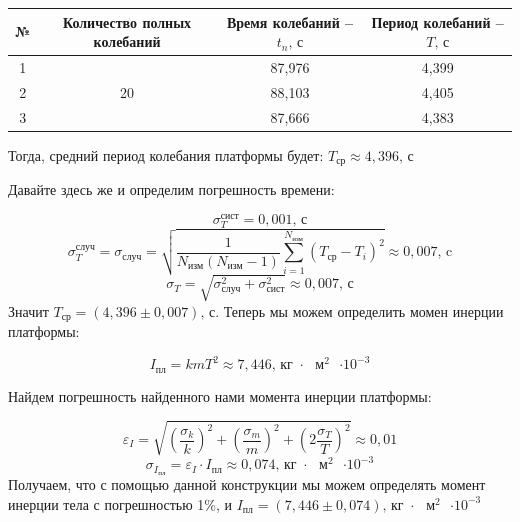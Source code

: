 \documentclass[a4paper,12pt]{article}
\begin{document}
	\begin{table}[!h]
		\begin{center}
			\begin{tabular}{|c|c|c|c|}
				\hline
				№ & Количество полных колебаний & Время колебаний -- $t_n \text{, с}$ & Период колебаний -- $T\text{, с}$\\
				\hline
				1 & \multirow{3}{*}{20} & 87,976 & 4,399\\
				\cline{1-1} \cline{3-4}
				2 &  & 88,103 & 4,405\\
				\cline{1-1} \cline{3-4}
				3 & & 87,666 & 4,383\\
				\hline
			\end{tabular}
		\end{center}
	\end{table}
	
	Тогда, средний период колебания платформы будет: $T_\text{ср} \approx 4,396\text{, с}$
	
	Давайте здесь же и определим погрешность времени: 
	
	\begin{equation}
		\sigma_T^{\text{сист}} = 0,001\text{, с}
	\end{equation}
	\begin{equation}
		\sigma_T^{\text{случ}} = \sigma_\text{случ}=\sqrt{\frac{1}{  N_\text{изм} \left( N_\text{изм} - 1 \right)}\sum_{i=1}^{N_\text{изм}}\left( T_\text{ср} - T_i \right)^2 } \approx 0,007\text{, c}
	\end{equation}
	\begin{equation}
		\sigma_T = \sqrt{\sigma_\text{случ}^{2} + \sigma_{\text{сист}}^{2}} \approx 0,007\text{, с}
	\end{equation}
	Значит $T_\text{ср} = \left(4,396 \pm 0,007\right)\text{, с}$. Теперь мы можем определить момен инерции платформы:
	
	\begin{equation}
			I_\text{пл} = kmT^2 \approx 7,446  \text{,  кг $\cdot$ $\text{м}^2$ $\cdot 10^{-3}$}  
	\end{equation}

	Найдем погрешность найденного нами момента инерции платформы:
	
	\begin{equation}
		\varepsilon_I = \sqrt{ \left(\frac{\sigma_k}{k}\right)^2 +\left(\frac{\sigma_m}{m}\right)^2 + \left(2\frac{\sigma_T}{T}\right)^2} \approx 0,01
	\end{equation}
	\begin{equation}
		\sigma_{I_\text{пл}} = \varepsilon_I \cdot I_\text{пл} \approx 0,074 \text{,  кг $\cdot$ $\text{м}^2$ $\cdot 10^{-3}$}
	\end{equation}
	Получаем, что с помощью данной конструкции мы можем определять момент инерции тела с погрешностью 1\%, и $I_\text{пл} = \left(7,446 \pm 0,074\right) \text{,  кг $\cdot$ $\text{м}^2$ $\cdot 10^{-3}$}$
	
\end{document}
